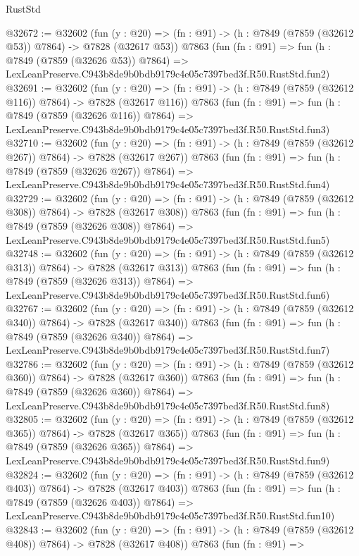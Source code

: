 \begin{lexlean}{RustStd}
\begin{coremodule}
@32672 := @32602
    (fun (y : @20) => (fn : @91) -> (h : @7849 (@7859 (@32612 @53)) @7864) -> @7828 (@32617 @53))
    @7863
    (fun (fn : @91) =>
    fun (h : @7849 (@7859 (@32626 @53)) @7864) =>
    LexLeanPreserve.C943b8de9b0bdb9179c4e05c7397bed3f.R50.RustStd.fun2)
@32691 := @32602
    (fun (y : @20) => (fn : @91) -> (h : @7849 (@7859 (@32612 @116)) @7864) -> @7828 (@32617 @116))
    @7863
    (fun (fn : @91) =>
    fun (h : @7849 (@7859 (@32626 @116)) @7864) =>
    LexLeanPreserve.C943b8de9b0bdb9179c4e05c7397bed3f.R50.RustStd.fun3)
@32710 := @32602
    (fun (y : @20) => (fn : @91) -> (h : @7849 (@7859 (@32612 @267)) @7864) -> @7828 (@32617 @267))
    @7863
    (fun (fn : @91) =>
    fun (h : @7849 (@7859 (@32626 @267)) @7864) =>
    LexLeanPreserve.C943b8de9b0bdb9179c4e05c7397bed3f.R50.RustStd.fun4)
@32729 := @32602
    (fun (y : @20) => (fn : @91) -> (h : @7849 (@7859 (@32612 @308)) @7864) -> @7828 (@32617 @308))
    @7863
    (fun (fn : @91) =>
    fun (h : @7849 (@7859 (@32626 @308)) @7864) =>
    LexLeanPreserve.C943b8de9b0bdb9179c4e05c7397bed3f.R50.RustStd.fun5)
@32748 := @32602
    (fun (y : @20) => (fn : @91) -> (h : @7849 (@7859 (@32612 @313)) @7864) -> @7828 (@32617 @313))
    @7863
    (fun (fn : @91) =>
    fun (h : @7849 (@7859 (@32626 @313)) @7864) =>
    LexLeanPreserve.C943b8de9b0bdb9179c4e05c7397bed3f.R50.RustStd.fun6)
@32767 := @32602
    (fun (y : @20) => (fn : @91) -> (h : @7849 (@7859 (@32612 @340)) @7864) -> @7828 (@32617 @340))
    @7863
    (fun (fn : @91) =>
    fun (h : @7849 (@7859 (@32626 @340)) @7864) =>
    LexLeanPreserve.C943b8de9b0bdb9179c4e05c7397bed3f.R50.RustStd.fun7)
@32786 := @32602
    (fun (y : @20) => (fn : @91) -> (h : @7849 (@7859 (@32612 @360)) @7864) -> @7828 (@32617 @360))
    @7863
    (fun (fn : @91) =>
    fun (h : @7849 (@7859 (@32626 @360)) @7864) =>
    LexLeanPreserve.C943b8de9b0bdb9179c4e05c7397bed3f.R50.RustStd.fun8)
@32805 := @32602
    (fun (y : @20) => (fn : @91) -> (h : @7849 (@7859 (@32612 @365)) @7864) -> @7828 (@32617 @365))
    @7863
    (fun (fn : @91) =>
    fun (h : @7849 (@7859 (@32626 @365)) @7864) =>
    LexLeanPreserve.C943b8de9b0bdb9179c4e05c7397bed3f.R50.RustStd.fun9)
@32824 := @32602
    (fun (y : @20) => (fn : @91) -> (h : @7849 (@7859 (@32612 @403)) @7864) -> @7828 (@32617 @403))
    @7863
    (fun (fn : @91) =>
    fun (h : @7849 (@7859 (@32626 @403)) @7864) =>
    LexLeanPreserve.C943b8de9b0bdb9179c4e05c7397bed3f.R50.RustStd.fun10)
@32843 := @32602
    (fun (y : @20) => (fn : @91) -> (h : @7849 (@7859 (@32612 @408)) @7864) -> @7828 (@32617 @408))
    @7863
    (fun (fn : @91) =>

\end{coremodule}
\end{lexlean}
